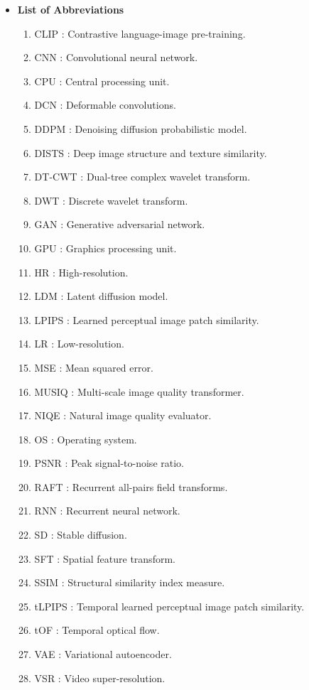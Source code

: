 \begin{itemize}
\item[\Large $\dagger$] {\Large \textbf{List of Abbreviations}}
    \begin{enumerate}
    \item[$\cdot$] {CLIP : Contrastive language-image pre-training.}
    \item[$\cdot$] {CNN : Convolutional neural network.}
    \item[$\cdot$] {CPU : Central processing unit.}
    \item[$\cdot$] {DCN : Deformable convolutions.}
    \item[$\cdot$] {DDPM : Denoising diffusion probabilistic model.}
    \item[$\cdot$] {DISTS : Deep image structure and texture similarity.}
    \item[$\cdot$] {DT-CWT : Dual-tree complex wavelet transform.}
    \item[$\cdot$] {DWT : Discrete wavelet transform.}
    \item[$\cdot$] {GAN : Generative adversarial network.}
    \item[$\cdot$] {GPU : Graphics processing unit.}
    \item[$\cdot$] {HR : High-resolution.}
    \item[$\cdot$] {LDM : Latent diffusion model.}
    \item[$\cdot$] {LPIPS : Learned perceptual image patch similarity.}
    \item[$\cdot$] {LR : Low-resolution.}
    \item[$\cdot$] {MSE : Mean squared error.}
    \item[$\cdot$] {MUSIQ : Multi-scale image quality transformer.}
    \item[$\cdot$] {NIQE : Natural image quality evaluator.}
    \item[$\cdot$] {OS : Operating system.}
    \item[$\cdot$] {PSNR : Peak signal-to-noise ratio.}
    \item[$\cdot$] {RAFT : Recurrent all-pairs field transforms.}
    \item[$\cdot$] {RNN : Recurrent neural network.}
    \item[$\cdot$] {SD : Stable diffusion.}
    \item[$\cdot$] {SFT : Spatial feature transform.}
    \item[$\cdot$] {SSIM : Structural similarity index measure.}
    \item[$\cdot$] {tLPIPS : Temporal learned perceptual image patch similarity.}
    \item[$\cdot$] {tOF : Temporal optical flow.}
    \item[$\cdot$] {VAE : Variational autoencoder.}
    \item[$\cdot$] {VSR : Video super-resolution.}
    \end{enumerate}
\end{itemize}